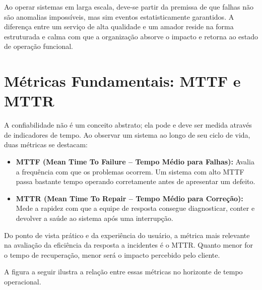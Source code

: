 \documentclass[12pt,a4paper,twoside]{report}
\begin{document}
Ao operar sistemas em larga escala, deve-se partir da premissa de que falhas não são anomalias impossíveis, mas sim eventos estatisticamente garantidos. A diferença entre um serviço de alta qualidade e um amador reside na forma estruturada e calma com que a organização absorve o impacto e retorna ao estado de operação funcional.

\section{Métricas Fundamentais: MTTF e MTTR}

A confiabilidade não é um conceito abstrato; ela pode e deve ser medida através de indicadores de tempo. Ao observar um sistema ao longo de seu ciclo de vida, duas métricas se destacam:
\begin{itemize}
    \item \textbf{MTTF (Mean Time To Failure -- Tempo Médio para Falhas):} Avalia a frequência com que os problemas ocorrem. Um sistema com alto MTTF passa bastante tempo operando corretamente antes de apresentar um defeito.
    \item \textbf{MTTR (Mean Time To Repair -- Tempo Médio para Correção):} Mede a rapidez com que a equipe de resposta consegue diagnosticar, conter e devolver a saúde ao sistema após uma interrupção.
\end{itemize}

Do ponto de vista prático e da experiência do usuário, a métrica mais relevante na avaliação da eficiência da resposta a incidentes é o MTTR. Quanto menor for o tempo de recuperação, menor será o impacto percebido pelo cliente. 

A figura a seguir ilustra a relação entre essas métricas no horizonte de tempo operacional.
\end{document}
